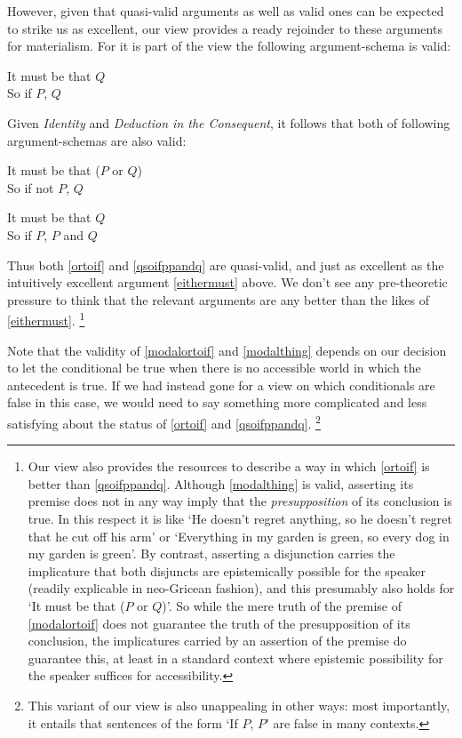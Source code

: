 \documentclass[If.tex]{subfiles}
\begin{document}
However, given that quasi-valid arguments as well as valid ones can be expected to strike us as excellent, our view provides a ready rejoinder to these arguments for materialism. For it is part of the view the following argument-schema is valid:
\begin{prop}
	\sitem[Must-if] \label{mustif}
	\parbox[t]{\linewidth}{It must be that $Q$\\
	So if $P$, $Q$}
\end{prop}
Given \emph{Identity} and \emph{Deduction in the Consequent}, it follows that both of following argument-schemas are also valid:
\begin{prop}
	\sitem[Modalised Or-to-if] \label{modalortoif}
	\parbox[t]{\linewidth}{It must be that ($P$ or $Q$)\\
	So if not $P$, $Q$}
	 \label{modalthing}
	\parbox[t]{\linewidth}{It must be that $Q$\\
	So if $P$, $P$ and $Q$}
\end{prop}
Thus both \ref{ortoif} and \ref{qsoifppandq} are quasi-valid, and just as excellent as the intuitively excellent argument \ref{eithermust} above. We don't see any pre-theoretic pressure to think that the relevant arguments are any better than the likes of \ref{eithermust}.%
\footnote{Our view also provides the resources to describe a way in which \ref{ortoif} is better than \ref{qsoifppandq}.  Although \ref{modalthing} is valid, asserting its premise does not in any way imply that the \emph{presupposition} of its conclusion is true.  In this respect it is like ‘He doesn't regret anything, so he doesn't regret that he cut off his arm’ or ‘Everything in my garden is green, so every dog in my garden is green’.  By contrast, asserting a disjunction carries the implicature that both disjuncts are epistemically possible for the speaker (readily explicable in neo-Gricean fashion), and this presumably also holds for ‘It must be that ($P$ or $Q$)’.  So while the mere truth of the premise of \ref{modalortoif} does not guarantee the truth of the presupposition of its conclusion, the implicatures carried by an assertion of the premise do guarantee this, at least in a standard context where epistemic possibility for the speaker suffices for accessibility.}

Note that the validity of \ref{modalortoif} and \ref{modalthing} depends on our decision to let the conditional be true when there is no accessible world in which the antecedent is true. If we had instead gone for a view on which conditionals are false in this case, we would need to say something more complicated and less satisfying about the status of \ref{ortoif} and \ref{qsoifppandq}.%
\footnote{This variant of our view is also unappealing in other ways: most importantly, it entails that sentences of the form ‘If $P$, $P$’ are false in many contexts.}
\end{document}
